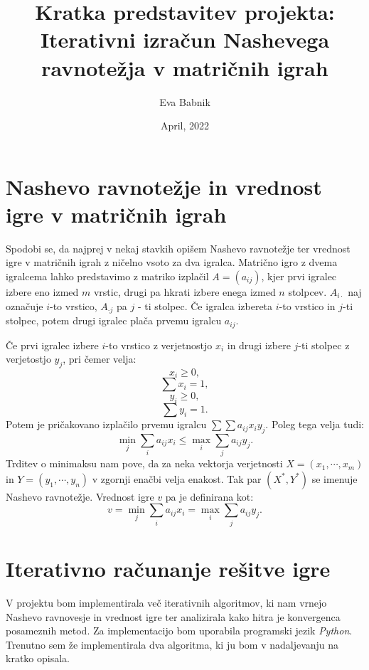 \documentclass[a4paper,12pt]{article}
\begin{document}
\title{Kratka predstavitev projekta: Iterativni izračun Nashevega ravnotežja v matričnih igrah}
\author{Eva Babnik}
\date{April, 2022}
\maketitle


\newpage
\section{Nashevo ravnotežje in vrednost igre v matričnih igrah}

Spodobi se, da najprej v nekaj stavkih opišem Nashevo ravnotežje ter vrednost igre v matričnih igrah z ničelno vsoto za dva igralca. 
Matrično igro z dvema igralcema lahko predstavimo z matriko izplačil $A=(a_{ij})$, kjer prvi igralec izbere eno izmed $m$ vrstic, drugi pa hkrati izbere enega izmed
$n$ stolpcev. $A_{i\cdot}$ naj označuje $i$-to vrstico, $A_{\cdot j}$ pa $j$ - ti stolpec. Če igralca izbereta $i$-to vrstico in $j$-ti stolpec, potem drugi igralec plača prvemu igralcu $a_{ij}$. \par
Če prvi igralec izbere $i$-to vrstico z verjetnostjo $x_i$ in drugi izbere $j$-ti stolpec z verjetostjo $y_j$, pri čemer velja:
\begin{equation}
    \label{eqn:e1}
    x_i \geq 0,
\end{equation}
\begin{equation}
    \label{eqn:e2}
    \sum x_i = 1,
\end{equation}
\begin{equation}
    \label{eqn:e3}
y_i \geq 0,
\end{equation}
\begin{equation}
    \label{eqn:e4}
    \sum y_i = 1.
\end{equation}
Potem je pričakovano izplačilo prvemu igralcu $\sum \sum a_{ij}x_i y_j$. Poleg tega velja tudi:
\begin{equation*}
    \min_j \sum_i a_{ij}x_i \leq \max_i \sum_j a_{ij} y_j.
\end{equation*}
Trditev o minimaksu nam pove, da za neka vektorja verjetnosti $X = (x_1, \cdots, x_m)$ in $Y = (y_1, \cdots, y_n)$ v zgornji enačbi velja enakost. Tak par $(X^*, Y^*)$
se imenuje Nashevo ravnotežje. Vrednost igre $v$ pa je definirana kot:
\begin{equation*}
    v = \min_j \sum_{i} a_{ij}x_i = \max_i \sum_j a_{ij} y_j.
\end{equation*}
\section{Iterativno računanje rešitve igre}
V projektu bom implementirala več iterativnih algoritmov, ki nam vrnejo Nashevo ravnovesje in vrednost igre ter analizirala kako hitra je konvergenca posameznih metod.
Za implementacijo bom uporabila programski jezik \textit{Python}. Trenutno sem že implementirala dva algoritma, ki ju bom v nadaljevanju na kratko opisala. \par
\end{document}
